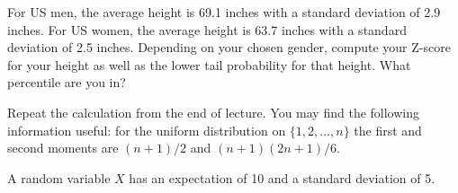 \documentclass[addpoints,12pt]{exam}
\begin{document}
\begin{questions}
\begin{parts}
\vspace{1.5in}

\end{parts}
\addpoints

\question[2] For US men, the average height is 69.1 inches with a standard deviation of 2.9 inches. For US women, the average height is 63.7 inches with a standard deviation of 2.5 inches. Depending on your chosen gender, compute your Z-score for your height as well as the lower tail probability for that height. What percentile are you in?

\vspace{1.5in}

\newpage
\question[4] Repeat the calculation from the end of lecture. You may find the following information useful: for the uniform distribution on $\{1,2,\ldots, n\}$ the first and second moments are $(n+1)/2$ and $(n+1)(2n+1)/6$.

\noaddpoints
{}
\addpoints

\question[3] A random variable $X$ has an expectation of 10 and a standard deviation of 5.

\noaddpoints
{}
\addpoints

\end{questions}
\end{document}

